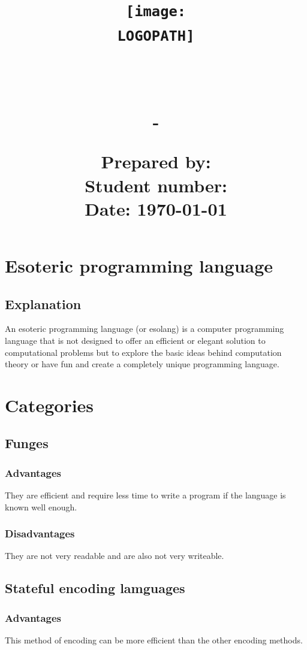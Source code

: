 \documentclass[12pt]{article}
\title{
    \texttt{[image: \\LOGOPATH]} \\
    \begin{center}
        \hfill \\
        \Large{\DEPARTEMENT} \\
        \Large{\COURSENUM\;-\;\COURSENAME} \\
        \vfill
        \textbf{\LARGE{\REPORTTITLE}}
    \end{center}
    \mbox{}
    \vfill
    \date{}
    \begin{flushleft}
        \Large{\textbf{Prepared by:} \STUDENTNAME} \\
        \Large{\textbf{Student number:} \STUDENTID} \\
        \Large{\textbf{Date:} \today}
    \end{flushleft}
}
\begin{document}
\maketitle

\newpage
\tableofcontents
\newpage

\section{Esoteric programming language \hfill {}}
\subsection{Explanation}
An esoteric programming language (or esolang) is a computer programming language that is not designed to offer an efficient or elegant solution to computational problems but to explore the basic ideas behind computation theory or have fun and create a completely unique programming language.
\cite{Question1Explain1}
\section{Categories \hfill {}}
\subsection{Funges}
\subsubsection{Advantages}
They are efficient and require less time to write a program if the language is known well enough.
\subsubsection{Disadvantages}
They are not very readable and are also not very writeable.
\cite{Question2Funges}
\subsection{Stateful encoding lamguages}
\subsubsection{Advantages}
This method of encoding can be more efficient than the other encoding methods.
\end{document}
